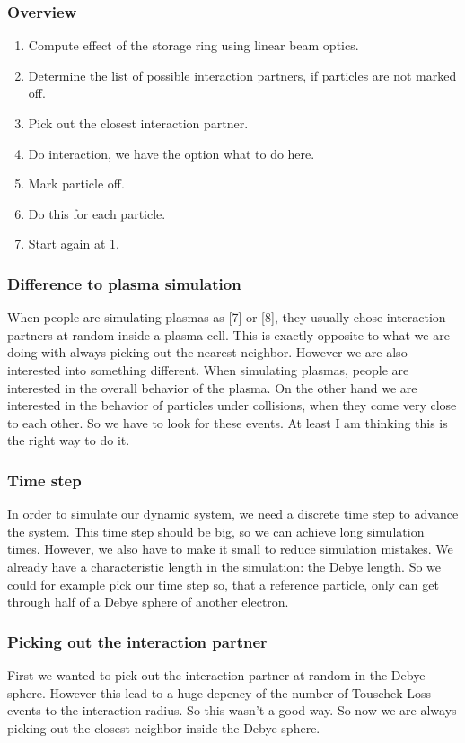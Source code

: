 \subsubsection{Overview}
\begin{enumerate}
\item Compute effect of the storage ring using linear beam optics.
\item Determine the list of possible interaction partners, if particles are not marked off.
\item Pick out the closest interaction partner.
\item Do interaction, we have the option what to do here.
\item Mark particle off.
\item Do this for each particle.
\item Start again at 1.
\end{enumerate}

\subsubsection{Difference to plasma simulation}
When people are simulating plasmas as [7] or [8], they usually chose interaction partners at random inside a plasma cell. This is exactly opposite to what we are doing with always picking out the nearest neighbor. However we are also interested into something different. When simulating plasmas, people are interested in the overall behavior of the plasma. On the other hand we are interested in the behavior of particles under collisions, when they come very close to each other. So we have to look for these events. At least I am thinking this is the right way to do it. 

\subsubsection{Time step}
In order to simulate our dynamic system, we need a discrete time step to advance the system. This time step should be big, so we can achieve long simulation times. However, we also have to make it small to reduce simulation mistakes. We already have a characteristic length in the simulation: the Debye length. So we could for example pick our time step so, that a reference particle, only can get through half of a Debye sphere of another electron.
\subsubsection{Picking out the interaction partner}
First we wanted to pick out the interaction partner at random in the Debye sphere. However this lead to a huge depency of the number of Touschek Loss events to the interaction radius. So this wasn't a good way. So now we are always picking out the closest neighbor inside the Debye sphere.

